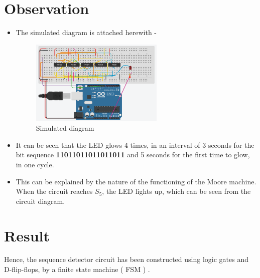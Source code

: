 \documentclass[a4paper,12pt]{article}
\begin{document}
\section{Observation}
\begin{itemize}
    \item The simulated diagram is attached herewith - \\
    \begin{figure}[h]
  \centering
  \includegraphics[width=0.6\textwidth]{tinkercad.png}
  \caption{Simulated diagram}
  \label{fig:simulated_diag}
\end{figure}
\item It can be seen that the LED glows 4 times, in an interval of 3 seconds for the bit sequence \textbf{11011011011011011} and 5 seconds for the first time to glow, in one cycle.
\item This can be explained by the nature of the functioning of the Moore machine. When the circuit reaches $S_5$, the LED lights up, which can be seen from the circuit diagram.
\end{itemize}

\section{Result}
Hence, the sequence detector circuit has been constructed using logic gates and D-flip-flops, by a finite state machine ( FSM ) .
\end{document}
